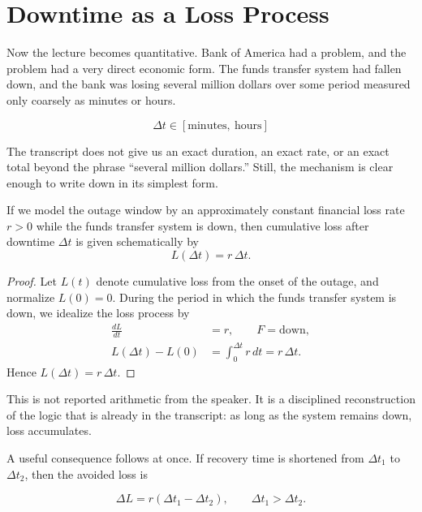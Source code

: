 \section{Downtime as a Loss Process}

Now the lecture becomes quantitative. Bank of America had a problem, and the problem had a very direct economic form. The funds transfer system had fallen down, and the bank was losing several million dollars over some period measured only coarsely as minutes or hours.

\begin{equation}
\Delta t \in [\text{minutes},\ \text{hours}]
\end{equation}

The transcript does not give us an exact duration, an exact rate, or an exact total beyond the phrase ``several million dollars.'' Still, the mechanism is clear enough to write down in its simplest form.

\begin{proposition}
If we model the outage window by an approximately constant financial loss rate \(r>0\) while the funds transfer system is down, then cumulative loss after downtime \(\Delta t\) is given schematically by
\begin{equation}
L(\Delta t)=r\,\Delta t.
\end{equation}
\end{proposition}

\begin{proof}
Let \(L(t)\) denote cumulative loss from the onset of the outage, and normalize \(L(0)=0\). During the period in which the funds transfer system is down, we idealize the loss process by
\begin{align}
\frac{dL}{dt} &= r, \qquad F=\text{down},\\
L(\Delta t)-L(0) &= \int_{0}^{\Delta t} r\,dt = r\,\Delta t.
\end{align}
Hence \(L(\Delta t)=r\,\Delta t\).
\end{proof}

This is not reported arithmetic from the speaker. It is a disciplined reconstruction of the logic that is already in the transcript: as long as the system remains down, loss accumulates.

A useful consequence follows at once. If recovery time is shortened from \(\Delta t_{1}\) to \(\Delta t_{2}\), then the avoided loss is

\begin{equation}
\Delta L = r(\Delta t_{1}-\Delta t_{2}),
\qquad \Delta t_{1}>\Delta t_{2}.
\end{equation}

